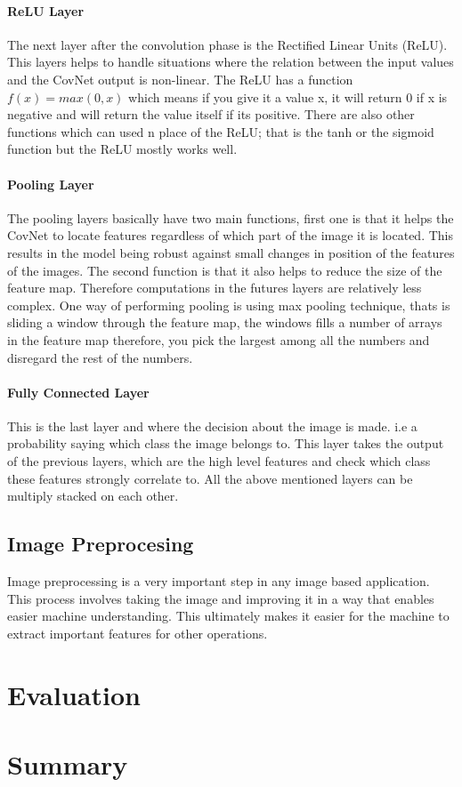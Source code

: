 \documentclass[12pt, a4paper,oneside]{report}
\begin{document}
\subsubsection{ReLU Layer}
The next layer after the convolution phase is the Rectified Linear Units (ReLU). This layers helps to handle situations where the relation between the input values and the CovNet output is non-linear. The ReLU has a function \(f(x) = max(0,x)\) which means if you give it a value x, it will return 0 if x is negative and will return the value itself if its positive. There are also other functions which can used n place of the ReLU; that is the tanh or the sigmoid function but the ReLU mostly works well.

\subsubsection{Pooling Layer}
The pooling layers basically have two main functions, first one is that it helps the CovNet to locate features regardless of which part of the image it is located. This results in the model being robust against small changes in position of the features of the images. The second function is that it also helps to reduce the size of the feature map. Therefore computations in the futures layers are relatively less complex. One way of performing pooling is using max pooling technique, thats is sliding a window through the feature map, the windows fills a number of arrays in the feature map therefore, you pick the largest among all the numbers and disregard the rest of the numbers. 

\subsubsection{Fully Connected Layer}
This is the last layer and where the decision about the image is made. i.e a probability saying which class the image belongs to. This layer takes the output of the previous layers, which are the high level features and check which class these features strongly correlate to. All the above mentioned layers can be multiply stacked 
on each other.



\section{Image Preprocesing}
Image preprocessing is a very important step in any image based application. This process involves taking the image and improving it in a way that enables easier machine understanding. This ultimately makes it easier for the machine to extract important features for other operations. 

\chapter{Evaluation}


\chapter{Summary}



\end{document}
